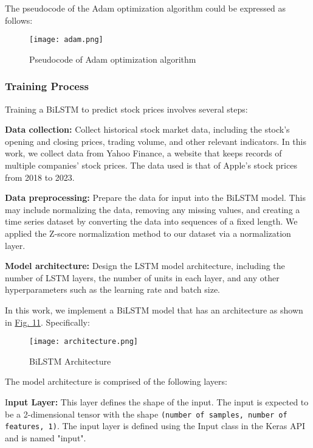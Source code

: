 \documentclass[a4paper]{article}
\begin{document}
The pseudocode of the Adam optimization algorithm could be expressed as follows:

\begin{figure}
    \centering
    \texttt{[image: adam.png]}
    \caption{Pseudocode of Adam optimization algorithm}
    \label{fig:adam}
\end{figure}
\subsubsection{Training Process}

Training a BiLSTM to predict stock prices involves several steps:

\textbf{Data collection:} Collect historical stock market data, including the stock's opening and closing prices, trading volume, and other relevant indicators. In this work, we collect data from Yahoo Finance, a website that keeps records of multiple companies' stock prices. The data used is that of Apple's stock prices from 2018 to 2023.

\textbf{Data preprocessing:} Prepare the data for input into the BiLSTM model. This may include normalizing the data, removing any missing values, and creating a time series dataset by converting the data into sequences of a fixed length. We applied the Z-score normalization method to our dataset via a normalization layer.

\textbf{Model architecture:} Design the LSTM model architecture, including the number of LSTM layers, the number of units in each layer, and any other hyperparameters such as the learning rate and batch size.

In this work, we implement a BiLSTM model that has an architecture as shown in \hyperref[fig:architecture]{Fig. 11}. Specifically:

\begin{figure}[!h]
    \centering
    \texttt{[image: architecture.png]}
    \caption{BiLSTM Architecture}
    \label{fig:architecture}
\end{figure}

The model architecture is comprised of the following layers:

I\textbf{nput Layer:} This layer defines the shape of the input. The input is expected to be a 2-dimensional tensor with the shape \texttt{(number of samples, number of features, 1)}. The input layer is defined using the Input class in the Keras API and is named "input".
\end{document}
